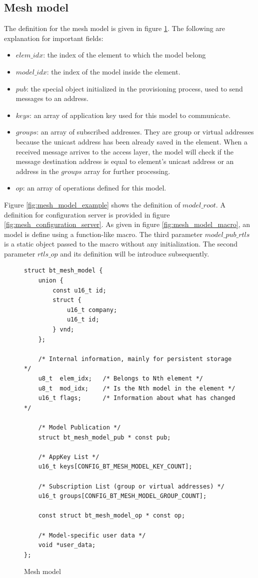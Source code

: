 \documentclass[\main/main.tex]{subfiles}
\begin{document}
\subsection{Mesh model}
The definition for the mesh model is given in figure \ref{fig:mesh_model}. The following are explanation for important fields:
\begin{itemize}
    \item $elem\_idx$: the index of the element to which the model belong
    \item  $model\_idx$: the index of the model inside the element.
    \item $pub$: the special object initialized in the provisioning process, used to send messages to an address.
    \item $keys$: an array of application key used for this model to communicate.
    \item $groups$: an array of subscribed addresses. They are group or virtual addresses because the unicast address has been already saved in the element. When a received message arrives to the access layer, the model will check if the message destination address is equal to element's unicast address or an address in the $groups$ array for further processing.
    \item $op$: an array of operations defined for this model.
\end{itemize}
Figure \ref{fig:mesh_model_example} shows the definition of $model\_root$. A definition for configuration server is provided in figure \ref{fig:mesh_configuration_server}. As given in figure \ref{fig:mesh_model_macro}, an model is define using a function-like macro. The third parameter $model\_pub\_rtls$ is a static object passed to the macro without any initialization. The second parameter $rtls\_op$ and its definition will be introduce subsequently.
\begin{figure}[H]
    \begin{lstlisting}[style=CStyle]
struct bt_mesh_model {
    union {
        const u16_t id;
        struct {
            u16_t company;
            u16_t id;
        } vnd;
    };

    /* Internal information, mainly for persistent storage */
    u8_t  elem_idx;   /* Belongs to Nth element */
    u8_t  mod_idx;    /* Is the Nth model in the element */
    u16_t flags;      /* Information about what has changed */

    /* Model Publication */
    struct bt_mesh_model_pub * const pub;

    /* AppKey List */
    u16_t keys[CONFIG_BT_MESH_MODEL_KEY_COUNT];

    /* Subscription List (group or virtual addresses) */
    u16_t groups[CONFIG_BT_MESH_MODEL_GROUP_COUNT];

    const struct bt_mesh_model_op * const op;

    /* Model-specific user data */
    void *user_data;
};
    \end{lstlisting}
    \caption{Mesh model}
    \label{fig:mesh_model}
\end{figure}
\end{document}
